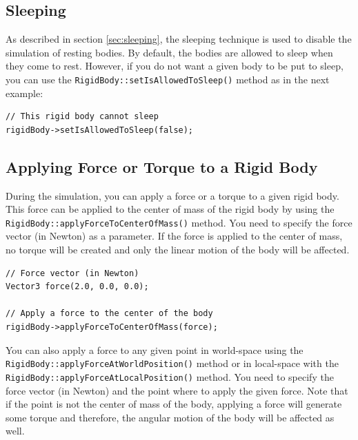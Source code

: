 \documentclass[a4paper,12pt]{article}
\begin{document}
    \subsection{Sleeping}
    \label{sec:rigidbodysleeping}

    As described in section \ref{sec:sleeping}, the sleeping technique is used to disable the simulation of resting bodies. By default, the bodies are
    allowed to sleep when they come to rest. However, if you do not want a given body to be put to sleep, you can use the
    \texttt{RigidBody::setIsAllowedToSleep()} method as in the next example: \\

   \begin{lstlisting}
// This rigid body cannot sleep
rigidBody->setIsAllowedToSleep(false);
 \end{lstlisting}

    \subsection{Applying Force or Torque to a Rigid Body}

    During the simulation, you can apply a force or a torque to a given rigid body. This force can be applied to the center of mass of the rigid body
    by using the \texttt{RigidBody::\allowbreak applyForceToCenterOfMass()} method. You need to specify the force vector (in Newton) as a parameter. If
    the force is applied to the center of mass, no torque will be created and only the linear motion of the body will be affected. \\

    \begin{lstlisting}
// Force vector (in Newton)
Vector3 force(2.0, 0.0, 0.0);

// Apply a force to the center of the body
rigidBody->applyForceToCenterOfMass(force);
  \end{lstlisting}

    \vspace{0.6cm}

     \begin{sloppypar}
    You can also apply a force to any given point in world-space using the \texttt{RigidBody::applyForceAtWorldPosition()} method or in
    local-space with the \texttt{RigidBody::applyForceAtLocalPosition()} method. You need to specify the force vector (in Newton) and the point
    where to apply the given force. Note that if the point is not the center of mass of the body, applying a force will generate some torque and
    therefore, the angular motion of the body will be affected as well. \\
     \end{sloppypar}
\end{document}
